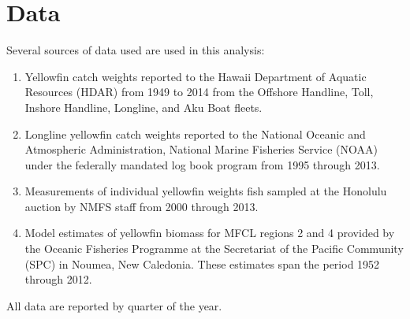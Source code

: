 \documentclass[12pt,letterpaper]{article}
\begin{document}
\section*{Data}
Several sources of data used are used in this analysis:
\begin{enumerate}
\item  Yellowfin catch weights reported to the Hawaii Department of Aquatic
Resources (HDAR) from 1949 to 2014 from the  Offshore Handline, Toll,
Inshore Handline, Longline, and Aku Boat fleets.
\item Longline yellowfin catch weights reported to the National Oceanic and
Atmospheric Administration, National Marine Fisheries Service (NOAA)
under the federally mandated log book program from 1995 through 2013.
\item Measurements of individual yellowfin weights fish sampled at the
Honolulu auction by NMFS staff from 2000 through 2013.
\item Model estimates of yellowfin biomass for MFCL regions 2 and 4
provided by the Oceanic Fisheries Programme at the Secretariat of the
Pacific Community (SPC) in Noumea, New Caledonia. These estimates span
the period 1952 through 2012.
\end{enumerate}
All data are reported by quarter of the year.



\end{document}
